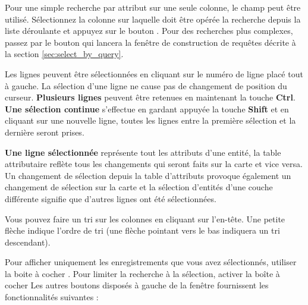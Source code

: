 Pour une simple recherche par attribut sur une seule colonne, le champ  peut être utilisé. Sélectionnez la colonne sur laquelle doit être opérée la recherche depuis la liste déroulante et appuyez sur le bouton . Pour des recherches plus complexes, passez par le bouton  qui lancera la fenêtre de construction de requêtes décrite à la section \ref{sec:select_by_query}.

Les lignes peuvent être sélectionnées en cliquant sur le numéro de ligne placé tout à gauche. La sélection d'une ligne ne cause pas de changement de position du curseur. \textbf{Plusieurs lignes} peuvent être retenues en maintenant la touche \textbf{Ctrl}. \textbf{Une sélection continue} s'effectue en gardant appuyée la touche \textbf{Shift} et en cliquant sur une nouvelle ligne, toutes les lignes entre la première sélection et la dernière seront prises.

\textbf{Une ligne sélectionnée} représente tout les attributs d'une entité, la table attributaire reflète tous les changements qui seront faits sur la carte et vice versa. Un changement de sélection depuis la table d'attributs provoque également un changement de sélection sur la carte et la sélection d'entités d'une couche différente signifie que d'autres lignes ont été sélectionnées.

Vous pouvez faire un tri sur les colonnes en cliquant sur l'en-tête. Une petite flèche indique l'ordre de tri (une flèche pointant vers le bas indiquera un tri descendant).

Pour afficher uniquement les enregistrements que vous avez sélectionnés, utiliser la boite à cocher . Pour limiter la recherche à la sélection, activer la boîte à cocher  Les autres boutons disposés à gauche de la fenêtre fournissent les fonctionnalités suivantes :

